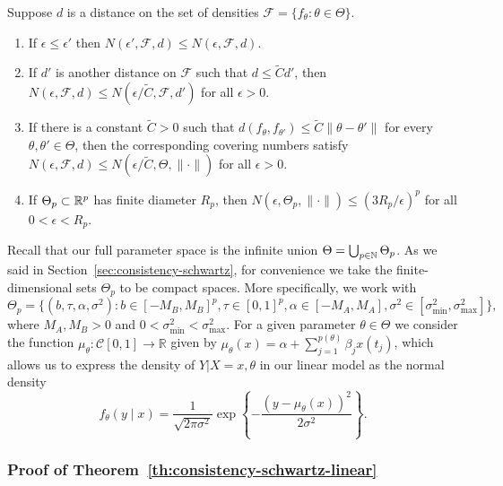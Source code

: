 \begin{lemma}\label{lemma:covering-number}
  Suppose \(d\) is a distance on the set of densities \(\mathcal F=\{f_\theta: \theta\in\Theta\}\).
  \begin{enumerate}[label=(\roman*)]
    \item If \(\epsilon\leq \epsilon'\) then \(N(\epsilon', \mathcal F, d) \leq N(\epsilon, \mathcal F, d)\).
    \item If \(d'\) is another distance on \(\mathcal F\) such that \(d\leq \tilde C d'\), then \(N(\epsilon, \mathcal F, d) \leq N(\epsilon/\tilde C, \mathcal F, d')\) for all \(\epsilon > 0\).
    \item If there is a constant \(\tilde C>0\) such that \(d(f_{\theta}, f_{\theta'})\leq \tilde C \|\theta - \theta'\|\) for every \(\theta, \theta' \in  \Theta\), then the corresponding covering numbers satisfy \(N(\epsilon, \mathcal F, d)\leq N(\epsilon/\tilde C, \Theta, \|\cdot\|)\) for all \(\epsilon > 0\). %
    \item If \(\Theta_p \subset \mathbb{R}^p\) has finite diameter \(R_p\), then \(N(\epsilon, \Theta_p, \|\cdot\|) \leq (3R_p/\epsilon)^p\) for all \(0<\epsilon<R_p\). %
  \end{enumerate}
\end{lemma}

Recall that our full parameter space is the infinite union \(\Theta=\bigcup_{p\in\mathbb{N}}\Theta_p\). As we said in Section~\ref{sec:consistency-schwartz}, for convenience we take the finite-dimensional sets \(\Theta_p\) to be compact spaces. More specifically, we work with
\[
  \Theta_p = \{(b, \tau, \alpha, \sigma^2): b\in [-M_B, M_B]^p, \tau \in [0,1]^p, \alpha\in [-M_A, M_A], \sigma^2 \in [\sigma^2_{\text{min}}, \sigma^2_{\text{max}}]\},
\]
where \(M_A,M_B>0\) and \(0<\sigma^2_{\text{min}}<\sigma^2_{\text{max}}\). For a given parameter \(\theta\in\Theta\) we consider the function \(\mu_\theta:\mathcal C[0,1]\to\mathbb R\) given by \(\mu_\theta(x)=\alpha + \sum_{j=1}^{p(\theta)} \beta_j x(t_j)\), which allows us to express the density of \(Y|X=x, \theta\) in our linear model as the normal density
\[
  f_\theta(y\mid x) = \frac{1}{\sqrt{2\pi\sigma^2}}\exp\left\{-\frac{(y-\mu_\theta(x))^2}{2\sigma^2}\right\}.
\]

\subsubsection*{Proof of Theorem~\ref{th:consistency-schwartz-linear}}

